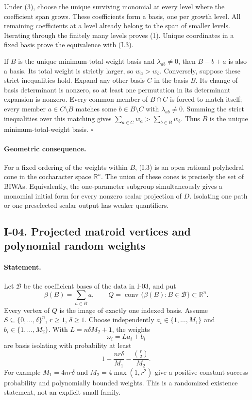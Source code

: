 \documentclass[11pt,a4paper]{article}
\theoremstyle{definition}\newtheorem{definition}{Definition}
\begin{document}
Under (3), choose the unique surviving monomial at every level where
the coefficient span grows.  These coefficients form a basis, one
per growth level.  All remaining coefficients at a level already
belong to the span of smaller levels.  Iterating through the finitely
many levels proves (1).  Unique coordinates in a fixed basis prove
the equivalence with (I.3).

If $B$ is the unique minimum-total-weight basis and
$\lambda_{ab}\ne0$, then $B-b+a$ is also a basis.  Its total weight
is strictly larger, so $w_a>w_b$.  Conversely, suppose these strict
inequalities hold.  Expand any other basis $C$ in the basis $B$.
Its change-of-basis determinant is nonzero, so at least one
permutation in its determinant expansion is nonzero.  Every common
member of $B\cap C$ is forced to match itself; every member
$a\in C\setminus B$ matches some $b\in B\setminus C$ with
$\lambda_{ab}\ne0$.  Summing the strict inequalities over this
matching gives $\sum_{a\in C}w_a>\sum_{b\in B}w_b$.
Thus $B$ is the unique minimum-total-weight basis. \hfill$\square$

\paragraph{Geometric consequence.}
For a fixed ordering of the weights within $B$, (I.3) is an open
rational polyhedral cone in the cocharacter space $\mathbb R^n$.
The union of these cones is precisely the set of BIWAs.  Equivalently,
the one-parameter subgroup simultaneously gives a monomial initial
form for every nonzero scalar projection of $D$.  Isolating one path
or one preselected scalar output has weaker quantifiers.

\subsection{I-04. Projected matroid vertices and polynomial random weights}
\label{I-04}

\paragraph{Statement.}
Let $\mathcal B$ be the coefficient bases of the data in I-03, and put
\[
 \beta(B)=\sum_{a\in B}a,\qquad
 Q=\operatorname{conv}\{\beta(B):B\in\mathcal B\}\subset\mathbb R^n.
\]
Every vertex of $Q$ is the image of exactly one indexed basis.
Assume $S\subseteq\{0,\ldots,\delta\}^{n}$, $r\ge1$, $\delta\ge1$.
Choose independently
$a_i\in\{1,\ldots,M_1\}$ and $b_i\in\{1,\ldots,M_2\}$.
With $L=n\delta M_2+1$, the weights
\[
 \omega_i=L a_i+b_i
\tag{I.4}
\]
are basis isolating with probability at least
\[
 1-\frac{nr\delta}{M_1}-\frac{\binom r2}{M_2}.
\tag{I.5}
\]
For example $M_1=4nr\delta$ and $M_2=4\max(1,r^2)$ give a positive
constant success probability and polynomially bounded weights.  This
is a randomized existence statement, not an explicit small family.
\end{document}
